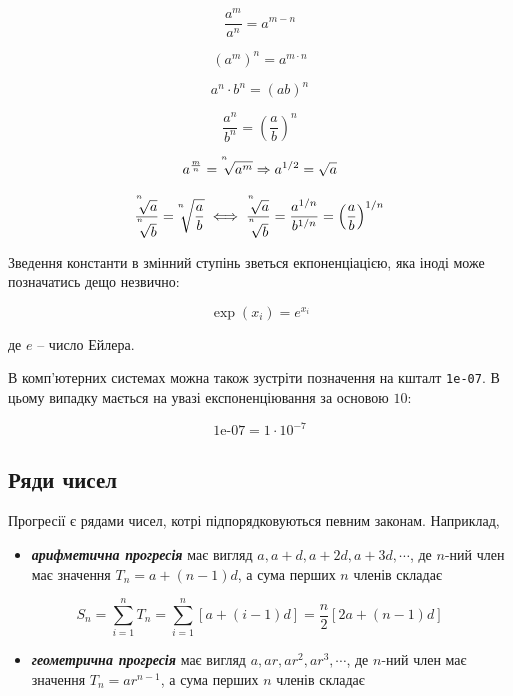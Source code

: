 \documentclass[
  11pt,
]{book}
\providecommand{\tightlist}{%
  \setlength{\itemsep}{0pt}\setlength{\parskip}{0pt}}
\begin{document}
\[\frac{a^m}{a^n} = a^{m-n}\]

\[(a^m)^n = a^{m \cdot n}\]

\[a^n \cdot b^n = (ab)^n\]

\[\frac{a^n}{b^n} = \left( \frac{a}{b}\right)^n\]

\[a^{\frac{m}{n}} = \sqrt[\leftroot{5} \uproot{10} n]{a^m} \Rightarrow a^{1/2} = \sqrt{a}\]

\[\frac{\sqrt[\leftroot{5} \uproot{10} n]{a}}{\sqrt[\leftroot{5} \uproot{10} n]{b}} = \sqrt[\leftroot{5} \uproot{10} n]{\frac{a}{b}} \iff \frac{\sqrt[\leftroot{5} \uproot{10} n]{a}}{\sqrt[\leftroot{5} \uproot{10} n]{b}} = \frac{a^{1/n}}{b^{1/n}} = \left( \frac{a}{b} \right)^{1/n}\]

Зведення константи в змінний ступінь зветься екпоненціацією, яка іноді
може позначатись дещо незвично:

\[\exp (x_i) = e^{x_i}\]

де \(e\) -- число Ейлера.

В комп'ютерних системах можна також зустріти позначення на кшталт
\texttt{1e-07}. В цьому випадку мається на увазі експоненціювання за
основою \(10\):

\[\text{1e-07} = 1 \cdot 10^{-7}\]

\subsection{Ряди
чисел}\label{ux440ux44fux434ux438-ux447ux438ux441ux435ux43b}

Прогресії є рядами чисел, котрі підпорядковуються певним законам.
Наприклад,

\begin{itemize}
\tightlist
\item
  \textbf{\emph{арифметична прогресія}} має вигляд
  \(a, a+d, a+2d, a+3d, \cdots\), де \(n\)-ний член має значення
  \(T_n = a + (n-1)d\), а сума перших \(n\) членів складає
\end{itemize}

\[S_n = \sum\limits_{i=1}^n T_n = \sum\limits_{i=1}^n \left[ a + (i-1)d \right] = \frac{n}{2}[2a+(n-1)d]\]

\begin{itemize}
\tightlist
\item
  \textbf{\emph{геометрична прогресія}} має вигляд
  \(a, ar, ar^2, ar^3, \cdots\), де \(n\)-ний член має значення
  \(T_n = ar^{n-1}\), а сума перших \(n\) членів складає
\end{itemize}
\end{document}
